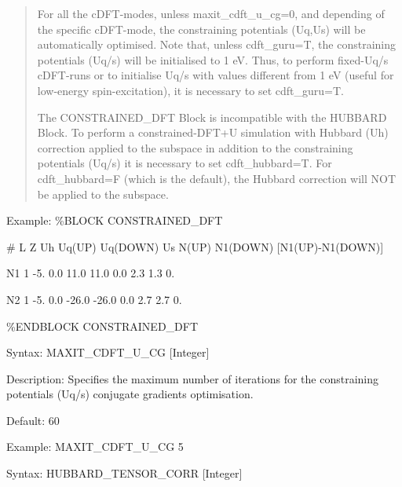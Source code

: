 \documentclass[letterpaper,10pt,english]{sphinxmanual}
\begin{document}
\begin{quote}
For all the cDFT-modes, unless maxit\_cdft\_u\_cg=0, and depending
of the specific cDFT-mode, the constraining potentials (Uq,Us) will
be automatically optimised. Note that, unless cdft\_guru=T, the
constraining potentials (Uq/s) will be initialised to 1 eV. Thus, to
perform fixed-Uq/s cDFT-runs or to initialise Uq/s with values
different from 1 eV (useful for low-energy spin-excitation), it is
necessary to set cdft\_guru=T.

The CONSTRAINED\_DFT Block is incompatible with the HUBBARD Block.
To perform a constrained-DFT+U simulation with Hubbard (Uh)
correction applied to the subspace in addition to the constraining
potentials (Uq/s) it is necessary to set cdft\_hubbard=T. For
cdft\_hubbard=F (which is the default), the Hubbard correction will
NOT be applied to the subspace.
\end{quote}

Example: \%BLOCK CONSTRAINED\_DFT

\# L Z Uh Uq(UP) Uq(DOWN) Us N(UP) N1(DOWN) {[}N1(UP)-N1(DOWN){]}

N1 1 -5. 0.0 11.0 11.0 0.0 2.3 1.3 0.

N2 1 -5. 0.0 -26.0 -26.0 0.0 2.7 2.7 0.

\%ENDBLOCK CONSTRAINED\_DFT


Syntax: MAXIT\_CDFT\_U\_CG {[}Integer{]}

Description: Specifies the maximum number of iterations for the
constraining potentials (Uq/s) conjugate gradients optimisation.

Default: 60

Example: MAXIT\_CDFT\_U\_CG 5


Syntax: HUBBARD\_TENSOR\_CORR {[}Integer{]}
\end{document}
